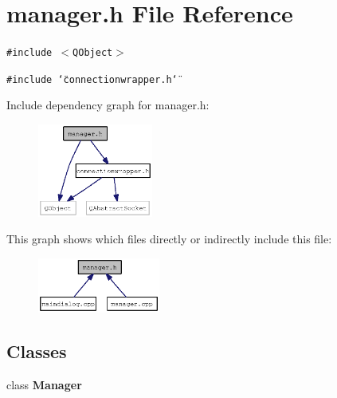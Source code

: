 \section{manager.h File Reference}
\label{manager_8h}
{\tt \#include $<$QObject$>$}\par
{\tt \#include \char`\"{}connectionwrapper.h\char`\"{}}\par


Include dependency graph for manager.h:\nopagebreak
\begin{figure}[H]
\begin{center}
\leavevmode
\includegraphics[width=107pt]{manager_8h__incl}
\end{center}
\end{figure}


This graph shows which files directly or indirectly include this file:\nopagebreak
\begin{figure}[H]
\begin{center}
\leavevmode
\includegraphics[width=114pt]{manager_8h__dep__incl}
\end{center}
\end{figure}
\subsection*{Classes}
\begin{CompactItemize}
\item 
class {\bf Manager}
\end{CompactItemize}
